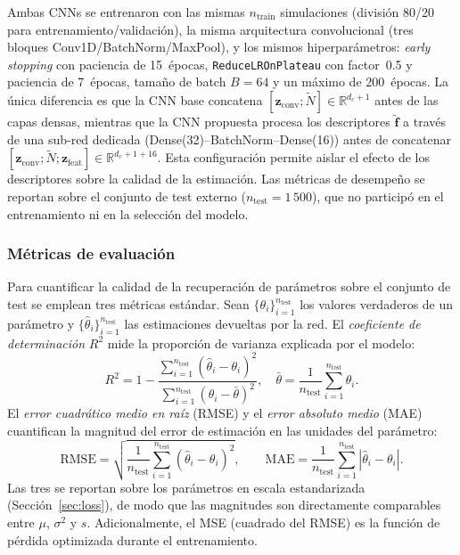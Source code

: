 \documentclass[a4paper,fleqn]{cas-sc}
\numberwithin{equation}{section}
\begin{document}
Ambas CNNs se entrenaron con las mismas $n_{\mathrm{train}}$ simulaciones
(divisi\'on 80/20 para entrenamiento/validaci\'on), la misma arquitectura
convolucional (tres bloques Conv1D/BatchNorm/MaxPool), y los mismos
hiperpar\'ametros: \textit{early stopping} con paciencia de 15~\'epocas,
\texttt{ReduceLROnPlateau} con factor~0.5 y paciencia de 7~\'epocas,
tama\~no de batch $B=64$ y un m\'aximo de 200~\'epocas. La \'unica diferencia
es que la CNN base concatena
$[\mathbf{z}_{\mathrm{conv}};\tilde{N}]\in\mathbb{R}^{d_c+1}$
antes de las capas densas, mientras que la CNN propuesta procesa los
descriptores $\tilde{\mathbf{f}}$ a trav\'es de una sub-red dedicada
(Dense(32)--BatchNorm--Dense(16)) antes de concatenar
$[\mathbf{z}_{\mathrm{conv}};\tilde{N};
\mathbf{z}_{\mathrm{feat}}]\in\mathbb{R}^{d_c+1+16}$. Esta configuraci\'on
permite aislar el efecto de los descriptores sobre la calidad de la
estimaci\'on. Las m\'etricas de desempe\~no se reportan sobre el conjunto de
test externo ($n_{\mathrm{test}}=1\,500$), que no particip\'o en el
entrenamiento ni en la selecci\'on del modelo.

\subsubsection{M\'etricas de evaluaci\'on}
\label{sec:metrics}

Para cuantificar la calidad de la recuperaci\'on de par\'ametros sobre el
conjunto de test se emplean tres m\'etricas est\'andar. Sean
$\{\theta_i\}_{i=1}^{n_{\mathrm{test}}}$ los valores verdaderos de un
par\'ametro y $\{\hat{\theta}_i\}_{i=1}^{n_{\mathrm{test}}}$ las
estimaciones devueltas por la red. El \emph{coeficiente de determinaci\'on}
$R^2$ mide la proporci\'on de varianza explicada por el modelo:
\begin{equation}
    R^2 = 1 - \frac{\sum_{i=1}^{n_{\mathrm{test}}}
    (\hat{\theta}_i - \theta_i)^2}
    {\sum_{i=1}^{n_{\mathrm{test}}}(\theta_i - \bar{\theta})^2},
    \quad \bar{\theta} = \frac{1}{n_{\mathrm{test}}}
    \sum_{i=1}^{n_{\mathrm{test}}}\theta_i.
    \label{eq:r2}
\end{equation}
El \emph{error cuadr\'atico medio en ra\'iz} (RMSE) y el \emph{error
absoluto medio} (MAE) cuantifican la magnitud del error de estimaci\'on
en las unidades del par\'ametro:
\begin{equation}
    \mathrm{RMSE} = \sqrt{\frac{1}{n_{\mathrm{test}}}
    \sum_{i=1}^{n_{\mathrm{test}}}(\hat{\theta}_i - \theta_i)^2},
    \qquad
    \mathrm{MAE} = \frac{1}{n_{\mathrm{test}}}
    \sum_{i=1}^{n_{\mathrm{test}}}|\hat{\theta}_i - \theta_i|.
    \label{eq:rmse_mae}
\end{equation}
Las tres se reportan sobre los par\'ametros en escala estandarizada
(Secci\'on~\ref{sec:loss}), de modo que las magnitudes son directamente
comparables entre $\mu$, $\sigma^2$ y $s$. Adicionalmente, el MSE
(cuadrado del RMSE) es la funci\'on de p\'erdida optimizada durante el
entrenamiento.
\end{document}
